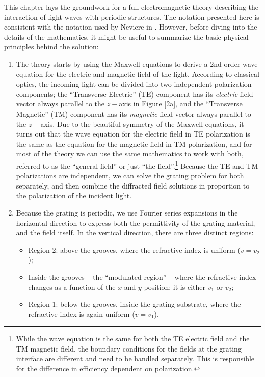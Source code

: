 This chapter lays the groundwork for a full electromagnetic theory describing the interaction of light waves with periodic structures.  The notation presented here is consistent with the notation used by Neviere in \cite{}.  However, before diving into the details of the mathematics, it might be useful to summarize the basic physical principles behind the solution:
  \begin{enumerate}
\item The theory starts by using the Maxwell equations to derive a 2nd-order wave equation for the electric and magnetic field of the light.  According to classical optics, the incoming light can be divided into two independent polarization components; the ``Transverse Electric'' (TE) component has its \emph{electric} field vector always parallel to the $z-$axis in Figure \ref{2a}, and the ``Transverse Magnetic'' (TM) component has its \emph{magnetic} field vector always parallel to the $z-$axis.  Due to the beautiful symmetry of the Maxwell equations, it turns out that the wave equation for the electric field in TE polarization is the same as the equation for the magnetic field in TM polarization, and for most of the theory we can use the same mathematics to work with both, referred to as the ``general field'' or just ``the field''.\footnote{While the wave equation is the same for both the TE electric field and the TM magnetic field, the boundary conditions for the fields at the grating interface are different and need to be handled separately.  This is responsible for the difference in efficiency dependent on polarization.}  Because the TE and TM polarizations are independent, we can solve the grating problem for both separately, and then combine the diffracted field solutions in proportion to the polarization of the incident light.
\item Because the grating is periodic, we use Fourier series expansions in the horizontal direction to express both the permittivity of the grating material, and the field itself. In the vertical direction, there are three distinct regions:
	\begin{itemize}
	\item Region 2: above the grooves, where the refractive index is uniform ($v = v_2$);
	\item Inside the grooves -- the ``modulated region'' -- where the refractive index changes as a function of the $x$ and $y$ position: it is either $v_1$ or $v_2$;
	\item Region 1: below the grooves, inside the grating substrate, where the refractive index is again uniform ($v=v_1$).

\end{itemize}
\end{enumerate}
